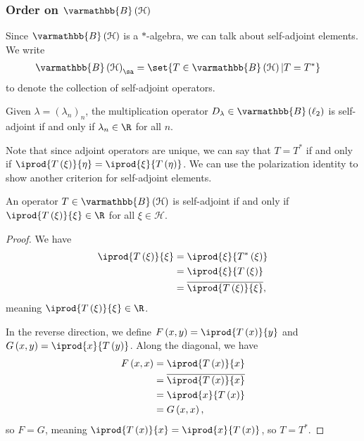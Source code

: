 \documentclass[10pt]{mypackage}
\renewcommand*{\mathbb}[1]{\varmathbb{#1}}
\newcommand{\B}{\mathbb{B}}
\begin{document}
\subsubsection{Order on $\B\left(\mathcal{H}\right)$}%
Since $\B\left(\mathcal{H}\right)$ is a $\ast$-algebra, we can talk about self-adjoint elements. We write
\begin{align*}
  \B\left(\mathcal{H}\right)_{\sa} &= \set{T\in \B\left(\mathcal{H}\right)|T = T^{\ast}}
\end{align*}
to denote the collection of self-adjoint operators.
\begin{example}
  Given $\lambda = \left(\lambda_n\right)_n$, the multiplication operator $D_{\lambda}\in \B\left(\ell_2\right)$ is self-adjoint if and only if $\lambda_n\in \R$ for all $n$.
\end{example}
Note that since adjoint operators are unique, we can say that $T = T^{\ast}$ if and only if $ \iprod{T\left(\xi\right)}{\eta} = \iprod{\xi}{T\left(\eta\right)} $. We can use the polarization identity to show another criterion for self-adjoint elements.
\begin{lemma}
  An operator $T\in \B\left(\mathcal{H}\right)$ is self-adjoint if and only if $ \iprod{T\left(\xi\right)}{\xi}\in \R $ for all $\xi\in \mathcal{H}$.
\end{lemma}
\begin{proof}
  We have
  \begin{align*}
    \iprod{T\left(\xi\right)}{\xi} &= \iprod{\xi}{T^{\ast}\left(\xi\right)}\\
                                   &= \iprod{\xi}{T\left(\xi\right)}\\
                                   &= \overline{ \iprod{T\left(\xi\right)}{\xi} },
  \end{align*}
  meaning $ \iprod{T\left(\xi\right)}{\xi}\in \R $.\newline

  In the reverse direction, we define $F\left(x,y\right) = \iprod{T\left(x\right)}{y}$ and $ G\left(x,y\right) = \iprod{x}{T\left(y\right)} $. Along the diagonal, we have
  \begin{align*}
    F\left(x,x\right) &= \iprod{T\left(x\right)}{x}\\
                      &= \overline{ \iprod{T\left(x\right)}{x} }\\
                      &= \iprod{x}{T\left(x\right)}\\
                      &= G\left(x,x\right),
  \end{align*}
  so $F = G$, meaning $ \iprod{T\left(x\right)}{x} = \iprod{x}{T\left(x\right)} $, so $T = T^{\ast}$.
\end{proof}
\end{document}
